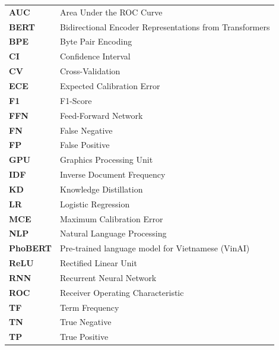 \vspace{0.3em}
\noindent\begin{tabular}{@{}p{2.4cm}p{11cm}@{}}
\textbf{AUC}     & Area Under the ROC Curve \\
\textbf{BERT}    & Bidirectional Encoder Representations from Transformers \\
\textbf{BPE}     & Byte Pair Encoding \\
\textbf{CI}      & Confidence Interval \\
\textbf{CV}      & Cross-Validation \\
\textbf{ECE}     & Expected Calibration Error \\
\textbf{F1}      & F1-Score \\
\textbf{FFN}     & Feed-Forward Network \\
\textbf{FN}      & False Negative \\
\textbf{FP}      & False Positive \\
\textbf{GPU}     & Graphics Processing Unit \\
\textbf{IDF}     & Inverse Document Frequency \\
\textbf{KD}      & Knowledge Distillation \\
\textbf{LR}      & Logistic Regression \\
\textbf{MCE}     & Maximum Calibration Error \\
\textbf{NLP}     & Natural Language Processing \\
\textbf{PhoBERT} & Pre-trained language model for Vietnamese (VinAI) \\
\textbf{ReLU}    & Rectified Linear Unit \\
\textbf{RNN}     & Recurrent Neural Network \\
\textbf{ROC}     & Receiver Operating Characteristic \\
\textbf{TF}      & Term Frequency \\
\textbf{TN}      & True Negative \\
\textbf{TP}      & True Positive \\
\end{tabular}

\newpage

\renewcommand*\listfigurename{Danh mục hình vẽ}
\listoffigures
{}
\clearpage

\renewcommand*\listtablename{Danh mục bảng biểu}
\listoftables
{}
\clearpage

\hypersetup{
  linkcolor=black,
  citecolor=primarypurple,
  urlcolor=black,
  filecolor=black,
}

\cleardoublepage
